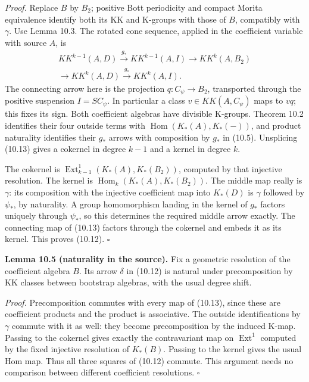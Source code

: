 \documentclass[
  11pt,
]{article}
\begin{document}
\emph{Proof.} Replace \(B\) by \(B_2\); positive Bott periodicity and
compact Morita equivalence identify both its KK and K-groups with those
of \(B\), compatibly with \(\gamma\). Use Lemma 10.3. The rotated cone
sequence, applied in the coefficient variable with source \(A\), is \[
\begin{gathered}
KK^{k-1}(A,D)\xrightarrow{g_*}KK^{k-1}(A,I)
\longrightarrow KK^k(A,B_2)\\
\longrightarrow KK^k(A,D)\xrightarrow{g_*}KK^k(A,I).
\end{gathered}
\tag{10.13}
\] The connecting arrow here is the projection \(q:C_\psi\to B_2\),
transported through the positive suspension \(I=SC_\psi\). In particular
a class \(v\in KK(A,C_\psi)\) maps to \(vq\); this fixes its sign. Both
coefficient algebras have divisible K-groups. Theorem 10.2 identifies
their four outside terms with \(\operatorname{Hom}(K_*(A),K_*(-))\), and
product naturality identifies their \(g_*\) arrows with composition by
\(g_*\) in (10.5). Unsplicing (10.13) gives a cokernel in degree \(k-1\)
and a kernel in degree \(k\).

The cokernel is \(\operatorname{Ext}^1_{k-1}(K_*(A),K_*(B_2))\),
computed by that injective resolution. The kernel is
\(\operatorname{Hom}_k(K_*(A),K_*(B_2))\). The middle map really is
\(\gamma\): its composition with the injective coefficient map into
\(K_*(D)\) is \(\gamma\) followed by \(\psi_*\), by naturality. A group
homomorphism landing in the kernel of \(g_*\) factors uniquely through
\(\psi_*\), so this determines the required middle arrow exactly. The
connecting map of (10.13) factors through the cokernel and embeds it as
its kernel. This proves (10.12). \(\square\)

\textbf{Lemma 10.5 (naturality in the source).} Fix a geometric
resolution of the coefficient algebra \(B\). Its arrow \(\delta\) in
(10.12) is natural under precomposition by KK classes between bootstrap
algebras, with the usual degree shift.

\emph{Proof.} Precomposition commutes with every map of (10.13), since
these are coefficient products and the product is associative. The
outside identifications by \(\gamma\) commute with it as well: they
become precomposition by the induced K-map. Passing to the cokernel
gives exactly the contravariant map on \(\operatorname{Ext}^1\) computed
by the fixed injective resolution of \(K_*(B)\). Passing to the kernel
gives the usual Hom map. Thus all three squares of (10.12) commute. This
argument needs no comparison between different coefficient resolutions.
\(\square\)
\end{document}

